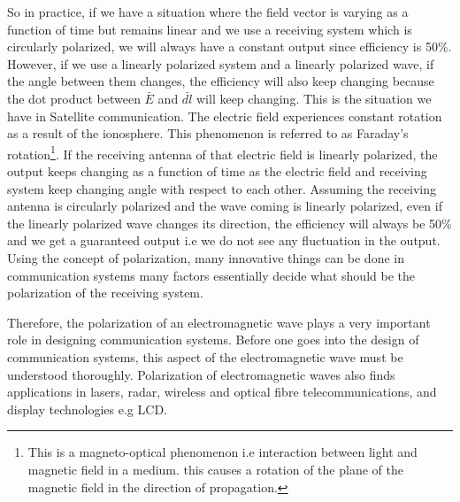 So in practice, if we have a situation where the field vector is varying as a function of time but remains linear and we use a receiving system which is circularly polarized, we will always have a constant output since efficiency is 50\%. However, if we use a linearly polarized system and a linearly polarized wave, if the angle between them changes, the efficiency will also keep changing because the dot product between $ \bar {E} $ and $ \bar{dl} $ will keep changing. This is the situation we have in Satellite communication. The electric field experiences constant rotation as a result of the ionosphere. This phenomenon is referred to as Faraday's rotation\footnote{This is a magneto-optical phenomenon i.e interaction between light and magnetic field in a medium. this causes a rotation of the plane of the magnetic field in the direction of propagation.}. If the receiving antenna of that electric field is linearly polarized, the output keeps changing as a function of time as the electric field and receiving system keep changing angle with respect to each other. Assuming the receiving antenna is circularly polarized and the wave coming is linearly polarized, even if the linearly polarized wave changes its direction, the efficiency will always be 50\% and we get a guaranteed output i.e we do not see any fluctuation in the output. Using the concept of polarization, many innovative things can be done in communication systems many factors essentially decide what should be the polarization of the receiving system.

Therefore, the polarization of an electromagnetic wave plays a very important role in designing communication systems. Before one goes into the design of communication systems, this aspect of the electromagnetic wave must be understood thoroughly. Polarization of electromagnetic waves also finds applications in lasers, radar, wireless and optical fibre telecommunications, and display technologies e.g LCD.

